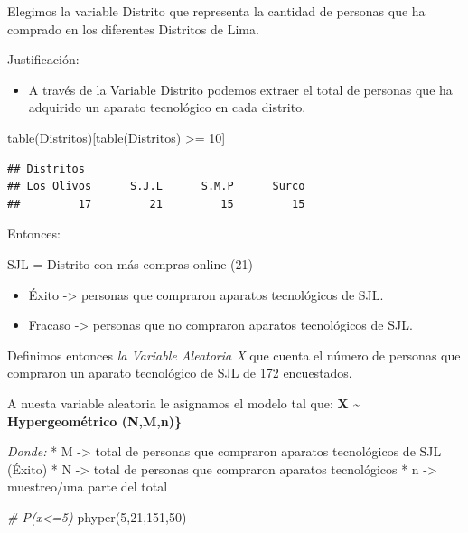 \documentclass[
]{article}
\newenvironment{Shaded}{\begin{snugshade}}{\end{snugshade}}
\newcommand{\CommentTok}[1]{\textcolor[rgb]{0.56,0.35,0.01}{\textit{#1}}}
\newcommand{\DecValTok}[1]{\textcolor[rgb]{0.00,0.00,0.81}{#1}}
\newcommand{\FunctionTok}[1]{\textcolor[rgb]{0.00,0.00,0.00}{#1}}
\newcommand{\NormalTok}[1]{#1}
\newcommand{\SpecialCharTok}[1]{\textcolor[rgb]{0.00,0.00,0.00}{#1}}
\providecommand{\tightlist}{%
  \setlength{\itemsep}{0pt}\setlength{\parskip}{0pt}}
\begin{document}
Elegimos la variable Distrito que representa la cantidad de personas que
ha comprado en los diferentes Distritos de Lima.

Justificación:

\begin{itemize}
\tightlist
\item
  A través de la Variable Distrito podemos extraer el total de personas
  que ha adquirido un aparato tecnológico en cada distrito.
\end{itemize}

\begin{Shaded}
\begin{Highlighting}[]
\FunctionTok{table}\NormalTok{(Distritos)[}\FunctionTok{table}\NormalTok{(Distritos) }\SpecialCharTok{\textgreater{}=} \DecValTok{10}\NormalTok{]}
\end{Highlighting}
\end{Shaded}

\begin{verbatim}
## Distritos
## Los Olivos      S.J.L      S.M.P      Surco 
##         17         21         15         15
\end{verbatim}

Entonces:

SJL = Distrito con más compras online (21)

\begin{itemize}
\item
  Éxito -\textgreater{} personas que compraron aparatos tecnológicos de
  SJL.
\item
  Fracaso -\textgreater{} personas que no compraron aparatos
  tecnológicos de SJL.
\end{itemize}

Definimos entonces \emph{la Variable Aleatoria X} que cuenta el número
de personas que compraron un aparato tecnológico de SJL de 172
encuestados.

A nuesta variable aleatoria le asignamos el modelo tal que: \textbf{X
\textasciitilde{} Hypergeométrico (N,M,n)\}}

\emph{Donde:} * M -\textgreater{} total de personas que compraron
aparatos tecnológicos de SJL (Éxito) * N -\textgreater{} total de
personas que compraron aparatos tecnológicos * n -\textgreater{}
muestreo/una parte del total

\begin{Shaded}
\begin{Highlighting}[]
\CommentTok{\# P(x\textless{}=5)}
\FunctionTok{phyper}\NormalTok{(}\DecValTok{5}\NormalTok{,}\DecValTok{21}\NormalTok{,}\DecValTok{151}\NormalTok{,}\DecValTok{50}\NormalTok{)}
\end{Highlighting}
\end{Shaded}
\end{document}
